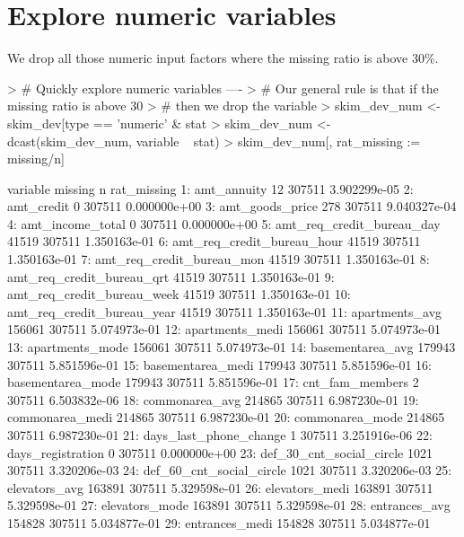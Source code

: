 \documentclass[a4paper]{article}
\begin{document}
\section{Explore numeric variables}
We drop all those numeric input factors where the missing ratio is above 30\%.
\begin{Schunk}
\begin{Sinput}
> # Quickly explore numeric variables ----
> # Our general rule is that if the missing ratio is above 30%
> # then we drop the variable
> skim_dev_num <- skim_dev[type == 'numeric' & stat %in% c('missing','n'), .(variable, stat, value)]
> skim_dev_num <- dcast(skim_dev_num, variable ~ stat)
> skim_dev_num[, rat_missing := missing/n]
\end{Sinput}
\begin{Soutput}
                        variable missing      n  rat_missing
 1:                  amt_annuity      12 307511 3.902299e-05
 2:                   amt_credit       0 307511 0.000000e+00
 3:              amt_goods_price     278 307511 9.040327e-04
 4:             amt_income_total       0 307511 0.000000e+00
 5:    amt_req_credit_bureau_day   41519 307511 1.350163e-01
 6:   amt_req_credit_bureau_hour   41519 307511 1.350163e-01
 7:    amt_req_credit_bureau_mon   41519 307511 1.350163e-01
 8:    amt_req_credit_bureau_qrt   41519 307511 1.350163e-01
 9:   amt_req_credit_bureau_week   41519 307511 1.350163e-01
10:   amt_req_credit_bureau_year   41519 307511 1.350163e-01
11:               apartments_avg  156061 307511 5.074973e-01
12:              apartments_medi  156061 307511 5.074973e-01
13:              apartments_mode  156061 307511 5.074973e-01
14:             basementarea_avg  179943 307511 5.851596e-01
15:            basementarea_medi  179943 307511 5.851596e-01
16:            basementarea_mode  179943 307511 5.851596e-01
17:              cnt_fam_members       2 307511 6.503832e-06
18:               commonarea_avg  214865 307511 6.987230e-01
19:              commonarea_medi  214865 307511 6.987230e-01
20:              commonarea_mode  214865 307511 6.987230e-01
21:       days_last_phone_change       1 307511 3.251916e-06
22:            days_registration       0 307511 0.000000e+00
23:     def_30_cnt_social_circle    1021 307511 3.320206e-03
24:     def_60_cnt_social_circle    1021 307511 3.320206e-03
25:                elevators_avg  163891 307511 5.329598e-01
26:               elevators_medi  163891 307511 5.329598e-01
27:               elevators_mode  163891 307511 5.329598e-01
28:                entrances_avg  154828 307511 5.034877e-01
29:               entrances_medi  154828 307511 5.034877e-01

\end{Soutput}
\end{Schunk}
\end{document}
